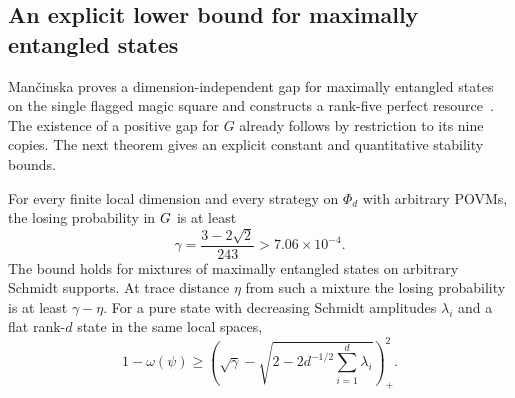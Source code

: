 \subsection{An explicit lower bound for maximally entangled states}\label{sec:operational-lower}

Man\v{c}inska proves a dimension-independent gap for maximally entangled
states on the single flagged magic square and constructs a rank-five
perfect resource~\cite[Corollary~4 and Proposition~1]{Mancinska26}.
The existence of a positive gap for $G$ already follows by restriction to
its nine copies. The next theorem gives an explicit constant and
quantitative stability bounds.

\begin{theorem}\label{thm:operational-tracial}
For every finite local dimension and every strategy on $\Phi_d$ with
arbitrary POVMs, the losing probability in $G$ is at least
\begin{equation}\label{eq:operational-tracial}
 \gamma=\frac{3-2\sqrt2}{243}>7.06\times10^{-4}.
\end{equation}
The bound holds for mixtures of maximally entangled states on arbitrary
Schmidt supports. At trace distance $\eta$ from such a mixture the losing
probability is at least $\gamma-\eta$. For a pure state with decreasing Schmidt
amplitudes $\lambda_i$ and a flat rank-$d$ state in the same local spaces,
\[
 1-\omega(\psi)\ge
 \left(\sqrt\gamma-\sqrt{2-2d^{-1/2}\sum_{i=1}^d\lambda_i}\right)_+^2.
\]
\end{theorem}

